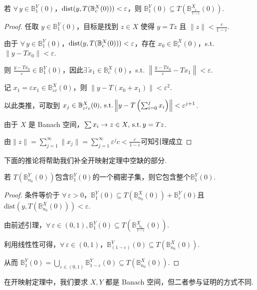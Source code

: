 \begin{lemma}[Banach]
    若 $\forall\, y \in \mathbb{B}_1^Y(0)$，$\operatorname{dist}(y, T(\mathbb{B}_c^X(0))) < \varepsilon$，则 $\mathbb{B}_1^Y(0) \subseteq T\left(\mathbb{B}_{\frac{c}{1-\varepsilon}}^X(0)\right)$.
\end{lemma}
\begin{proof}
    任取 $y \in \mathbb{B}_1^Y(0)$，目标是找到 $z \in X$ 使得 $y = Tz$ 且 $\|z\| < \frac{c}{1-\varepsilon}$.\par
    由于 $\forall\, y \in \mathbb{B}_1^Y(0)$，$\operatorname{dist}(y, T(\mathbb{B}_c^X(0))) < \varepsilon$，存在 $x_0 \in \mathbb{B}_c^X(0)$，s.t. $\|y - Tx_0\| < \varepsilon$.\par
    则 $\frac{y - Tx_0}{\varepsilon} \in \mathbb{B}_1^Y(0)$，因此$\exists\, \tilde{x}_1 \in \mathbb{B}_c^X(0)$，s.t. $\left\|\frac{y - Tx_0}{\varepsilon} - Tx_1\right\| < \varepsilon$.\par
    记 $x_1 = \varepsilon x_1 \in \mathbb{B}_{\varepsilon c}^X(0)$，则 $\|y - T(x_0 + x_1)\| < \varepsilon^2$.\par
    以此类推，可取到 $x_j \in \mathbb{B}_{\varepsilon^j c}^X(0),\operatorname{\,\text{s.t.}} \left\|y - T\left(\sum_{i=0}^j x_i\right)\right\| < \varepsilon^{j+1}$.\par
    由于 $X$ 是 Banach 空间，$\sum x_i\to z\in X,\operatorname{\,\text{s.t.}} y= Tz$.\par
    由$\|z\|=\sum_{j=1}^\infty\|x_j\|=\sum_{j=1}^\infty \varepsilon^j c < \frac{c}{1-\varepsilon}$可知引理成立
\end{proof}

下面的推论将帮助我们补全开映射定理中空缺的部分.
\begin{corollary}
    若 $T(\mathbb{B}_{n_0}^Y(0))$包含$\mathbb{B}_1^Y(0)$的一个稠密子集，则它包含整个$\mathbb{B}_1^Y(0)$.
\end{corollary}
\begin{proof}
    条件等价于 $\forall\, \varepsilon > 0$，$\mathbb{B}_{1}^Y(0) \subseteq T(\mathbb{B}_{n_0}^X(0)) + \mathbb{B}_{\varepsilon}^Y(0)$且$\mathrm{dist}(y, T(\mathbb{B}_{n_0}^X(0))) < \varepsilon$.\par
    由前述引理，$\forall\,\varepsilon\in(0,1),\mathbb{B}_{1}^Y(0) \subseteq T\left(\mathbb{B}_{\frac{n_0}{1-\varepsilon}}^X(0)\right)$.\par
    利用线性性可得，$\forall\, \varepsilon \in (0, 1)$，$\mathbb{B}_{(1-\varepsilon)}^Y(0) \subseteq T(\mathbb{B}_{n_0}^X(0))$.\par
    从而 $\mathbb{B}_{1}^Y(0) = \bigcup_{\varepsilon \in (0, 1)} \mathbb{B}_{1-\varepsilon}^Y(0) \subseteq T(\mathbb{B}_{n_0}^X(0))$.
\end{proof}
\begin{remark}
    在开映射定理中，我们要求 $X, Y$ 都是 Banach 空间，但二者参与证明的方式不同.
\end{remark}

